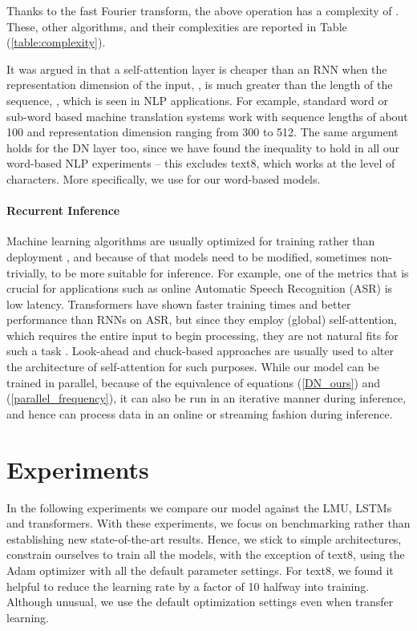 \documentclass{article}
\begin{document}
Thanks to the fast Fourier transform, the above operation has a complexity of . These, other algorithms, and their complexities are reported in Table (\ref{table:complexity}).

It was argued in \citet{vaswani2017attention} that a self-attention layer is cheaper than an RNN when the representation dimension of the input, , is much greater than the length of the sequence, , which is seen in NLP applications. For example, standard word or sub-word based machine translation systems work with sequence lengths of about 100 and representation dimension ranging from 300 to 512. The same argument holds for the DN layer too, since we have found the inequality  to hold in all our word-based NLP experiments -- this excludes text8, which works at the level of characters.  More specifically, we use  for our word-based models.

\paragraph{Recurrent Inference} Machine learning algorithms are usually optimized for training rather than deployment \citep{crankshaw2019design}, and because of that models need to be modified, sometimes non-trivially, to be more suitable for inference. For example, one of the metrics that is crucial for applications such as online Automatic Speech Recognition (ASR) is low latency. Transformers have shown faster training times and better performance than RNNs on ASR, but since they employ (global) self-attention, which requires the entire input to begin processing, they are not natural fits for such a task \citep{wang2020reducing}. Look-ahead \citep{zhang2020transformer} and chuck-based \citep{miao2020transformer} approaches are usually used to alter the architecture of self-attention for such purposes. While our model can be trained in parallel, because of the equivalence of equations (\ref{DN_ours}) and (\ref{parallel_frequency}), it can also be run in an iterative manner during inference, and hence can process data in an online or streaming fashion during inference.

\section{Experiments}

In the following experiments we compare our model against the LMU, LSTMs and transformers. With these experiments, we focus on benchmarking rather than establishing new state-of-the-art results. Hence, we stick to simple architectures, constrain ourselves to train all the models, with the exception of text8, using the Adam optimizer \cite{kingma2014adam} with all the default parameter settings. For text8, we found it helpful to reduce the learning rate by a factor of 10 halfway into training. Although unusual, we use the default optimization settings even when transfer learning. 
\end{document}
